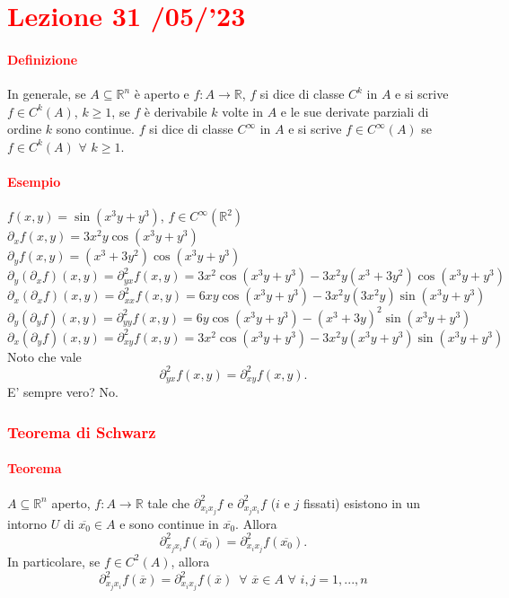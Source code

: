 \documentclass{article}
\newcommand{\R}{\mathbb{R}}
\begin{document}
\newpage
\section{\textcolor{red}{Lezione 31 \space{}/05/'23}}
\paragraph{\textcolor{red}{Definizione}} 
In generale, se $A \subseteq \R^n$ è aperto e $f:A\rightarrow\R$, $f$ si dice di classe $C^k$ in $A$ e si scrive $f \in C^k(A)$, $k \geq 1$, se $f$ è derivabile $k$ volte in $A$ e le sue derivate parziali di ordine $k$ sono continue. $f$ si dice di classe $C^\infty$ in $A$ e si scrive $f \in C^\infty(A)$ se $f\in C^k(A) \,\, \forall \,\, k \geq 1$.

\paragraph{\textcolor{red}{Esempio}}
$f(x,y)=\sin(x^3y+y^3)$, $f \in C^\infty(\R^2)$\\
$\partial_xf(x,y)=3x^2y \cos(x^3y+y^3)$\\
$\partial_y f(x,y)=(x^3+3y^2)\cos(x^3y+y^3)$\\
$\partial_y(\partial_xf)(x,y)=\partial_{yx}^2f(x,y)=3x^2 \cos(x^3y+y^3)-3x^2y(x^3+3y^2)\cos(x^3y+y^3)$\\
$\partial_x(\partial_x f)(x,y)= \partial_{xx}^2f(x,y)=6xy\cos(x^3y+y^3)-3x^2y(3x^2y)\sin(x^3y+y^3)$\\
$\partial_y(\partial_y f)(x,y)=\partial_{yy}^2f(x,y)=6y\cos(x^3y+y^3)-(x^3+3y)^2\sin(x^3y+y^3)$\\
$\partial_x(\partial_y f)(x,y)=\partial_{xy}^2f(x,y)=3x^2\cos(x^3y+y^3)-3x^2y(x^3y+y^3)\sin(x^3y+y^3)$\\
Noto che vale
\begin{equation*}
    \partial_{yx}^2f(x,y)=\partial_{xy}^2f(x,y).
\end{equation*}
E' sempre vero? No.

\subsubsection{\textcolor{red}{Teorema di Schwarz}}
\paragraph{\textcolor{red}{Teorema}}
$A \subseteq\R^n$ aperto, $f:A\rightarrow\R$ tale che $\partial_{x_ix_j}^2f$ e $\partial_{x_jx_i}^2f$ ($i$ e $j$ fissati) esistono in un intorno $U$ di $\overline{x_0}\in A$ e sono continue in $\overline{x_0}$. Allora
\begin{equation*}
    \partial_{x_jx_i}^2f(\overline{x_0})=\partial_{x_ix_j}^2f(\overline{x_0}).
\end{equation*}
In particolare, se $f \in C^2(A)$, allora 
\begin{equation*}
     \partial_{x_jx_i}^2f(\overline{x})=\partial_{x_ix_j}^2f(\overline{x})\,\,\, \forall\,\, \overline{x} \in A\,\, \forall \,\,i,j=1,...,n 
\end{equation*}  
\end{document}
